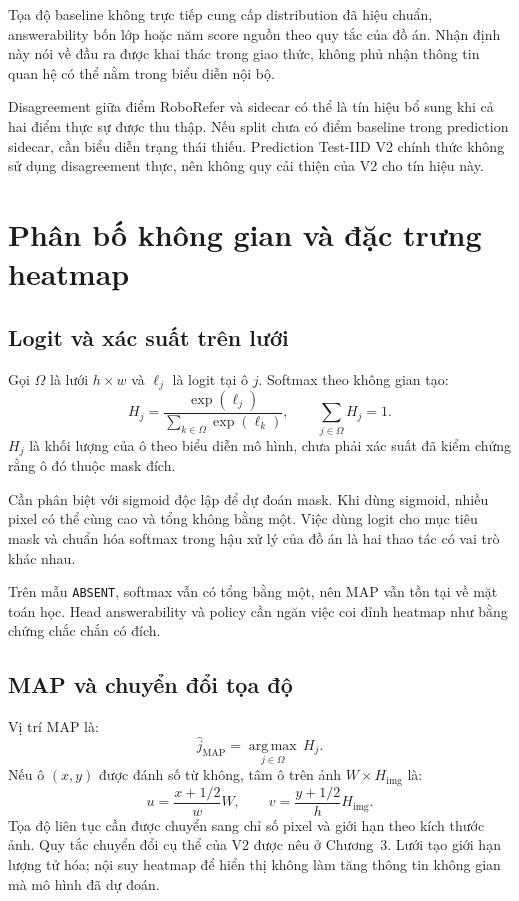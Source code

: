 Tọa độ baseline không trực tiếp cung cấp distribution đã hiệu chuẩn, answerability bốn lớp hoặc năm score nguồn theo quy tắc của đồ án. Nhận định này nói về đầu ra được khai thác trong giao thức, không phủ nhận thông tin quan hệ có thể nằm trong biểu diễn nội bộ.

Disagreement giữa điểm RoboRefer và sidecar có thể là tín hiệu bổ sung khi cả hai điểm thực sự được thu thập. Nếu split chưa có điểm baseline trong prediction sidecar, cần biểu diễn trạng thái thiếu. Prediction Test-IID V2 chính thức không sử dụng disagreement thực, nên không quy cải thiện của V2 cho tín hiệu này.

\section{Phân bố không gian và đặc trưng heatmap}
\label{sec:theory-spatial-distribution}

\subsection{Logit và xác suất trên lưới}

Gọi $\Omega$ là lưới $h\times w$ và $\ell_j$ là logit tại ô $j$. Softmax theo không gian tạo:
\begin{equation}
    H_j=\frac{\exp(\ell_j)}{\sum_{k\in\Omega}\exp(\ell_k)},
    \qquad \sum_{j\in\Omega}H_j=1.
    \label{eq:theory-spatial-softmax}
\end{equation}
$H_j$ là khối lượng của ô theo biểu diễn mô hình, chưa phải xác suất đã kiểm chứng rằng ô đó thuộc mask đích.

Cần phân biệt với sigmoid độc lập để dự đoán mask. Khi dùng sigmoid, nhiều pixel có thể cùng cao và tổng không bằng một. Việc dùng logit cho mục tiêu mask và chuẩn hóa softmax trong hậu xử lý của đồ án là hai thao tác có vai trò khác nhau.

Trên mẫu \texttt{ABSENT}, softmax vẫn có tổng bằng một, nên MAP vẫn tồn tại về mặt toán học. Head answerability và policy cần ngăn việc coi đỉnh heatmap như bằng chứng chắc chắn có đích.

\subsection{MAP và chuyển đổi tọa độ}

Vị trí MAP là:
\begin{equation}
    \widehat{j}_{\mathrm{MAP}}=
    \underset{j\in\Omega}{\operatorname{arg\,max}}\,H_j.
    \label{eq:theory-map}
\end{equation}
Nếu ô $(x,y)$ được đánh số từ không, tâm ô trên ảnh $W\times H_{\mathrm{img}}$ là:
\begin{equation}
    u=\frac{x+1/2}{w}W,\qquad
    v=\frac{y+1/2}{h}H_{\mathrm{img}}.
    \label{eq:theory-grid-pixel}
\end{equation}
Tọa độ liên tục cần được chuyển sang chỉ số pixel và giới hạn theo kích thước ảnh. Quy tắc chuyển đổi cụ thể của V2 được nêu ở Chương~3. Lưới tạo giới hạn lượng tử hóa; nội suy heatmap để hiển thị không làm tăng thông tin không gian mà mô hình đã dự đoán.

